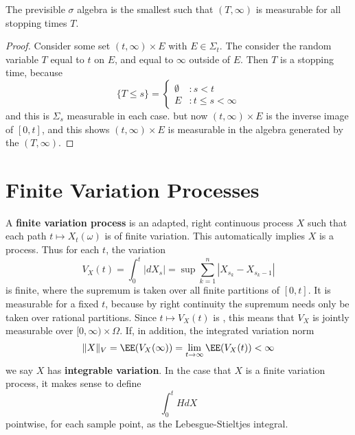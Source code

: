 \begin{corollary}
    The previsible $\sigma$ algebra is the smallest such that $(T,\infty)$ is measurable for all stopping times $T$.
\end{corollary}
\begin{proof}
    Consider some set $(t,\infty) \times E$ with $E \in \Sigma_t$. The consider the random variable $T$ equal to $t$ on $E$, and equal to $\infty$ outside of $E$. Then $T$ is a stopping time, because
    \[ \{ T \leq s \} = \begin{cases} \emptyset & : s < t \\ E & : t \leq s < \infty \end{cases} \]
    and this is $\Sigma_s$ measurable in each case. but now $(t,\infty) \times E$ is the inverse image of $[0,t]$, and this shows $(t,\infty) \times E$ is measurable in the algebra generated by the $(T,\infty)$.
\end{proof}

\section{Finite Variation Processes}

A {\bf finite variation process} is an adapted, right continuous process $X$ such that each path $t \mapsto X_t(\omega)$ is of finite variation. This automatically implies $X$ is a \cadlag process. Thus for each $t$, the variation
%
\[ V_X(t) = \int_0^t |dX_s| = \sup \sum_{k = 1}^n |X_{s_k} - X_{s_k - 1}| \]
%
is finite, where the supremum is taken over all finite partitions of $[0,t]$. It is measurable for a fixed $t$, because by right continuity the supremum needs only be taken over rational partitions. Since $t \mapsto V_X(t)$ is \cadlag, this means that $V_X$ is jointly measurable over $[0,\infty) \times \Omega$. If, in addition, the integrated variation norm
%
\[ \| X \|_V = \EE(V_X(\infty)) = \lim_{t \to \infty} \EE(V_X(t)) < \infty \]
%
we say $X$ has {\bf integrable variation}. In the case that $X$ is a finite variation process, it makes sense to define
%
\[ \int_0^t H dX \]
%
pointwise, for each sample point, as the Lebesgue-Stieltjes integral.

